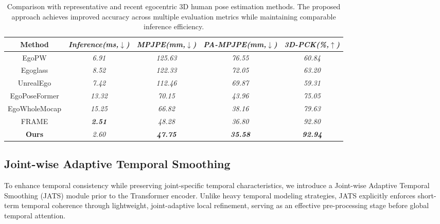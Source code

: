 \documentclass[conference]{IEEEtran}
\begin{document}
\begin{table}[htbp]
\caption{Comparison with representative and recent egocentric 3D human pose estimation methods. The proposed approach achieves improved accuracy across multiple evaluation metrics while maintaining comparable inference efficiency.}
\begin{center}
\begin{tabular}{c c c c c}
\hline
{Method}& {\textit{Inference(ms,$\downarrow$)}}& {\textit{MPJPE(mm,$\downarrow$)}}& {\textit{PA-MPJPE(mm,$\downarrow$)}}& {\textit{3D-PCK(\%,$\uparrow$)}}\\
\hline 
{EgoPW\cite{b5}} & {\textit{6.91}}& {\textit{125.63}}& {\textit{76.55}}& {\textit{60.84}} \\
{Egoglass\cite{b15}} & {\textit{8.52}}& {\textit{122.33}}& {\textit{72.05}}& {\textit{63.20}} \\
{UnrealEgo\cite{b6}} & {\textit{7.42}}& {\textit{112.46}}& {\textit{69.87}}& {\textit{59.31}} \\
{EgoPoseFormer\cite{b8}} & {\textit{13.32}}& {\textit{70.15}}& {\textit{43.96}}& {\textit{75.05}} \\
{EgoWholeMocap\cite{b3}} & {\textit{15.25}}& {\textit{66.82}}& {\textit{38.16}}& {\textit{79.63}} \\
{FRAME\cite{b1}} & \textbf{\textit{2.51}}& {\textit{48.28}}& {\textit{36.80}}& {\textit{92.80}} \\
\textbf{Ours} & \textit{2.60}& \textbf{\textit{47.75}}& \textbf{\textit{35.58}}& \textbf{\textit{92.94}} \\
\hline
\end{tabular}
\label{tab1}
\end{center}
\end{table}












\subsection{Joint-wise Adaptive Temporal Smoothing}
To enhance temporal consistency while preserving joint-specific temporal characteristics, we introduce a Joint-wise Adaptive Temporal Smoothing (JATS) module prior to the Transformer encoder. Unlike heavy temporal modeling strategies, JATS explicitly enforces short-term temporal coherence through lightweight, joint-adaptive local refinement, serving as an effective pre-processing stage before global temporal attention.
\end{document}
